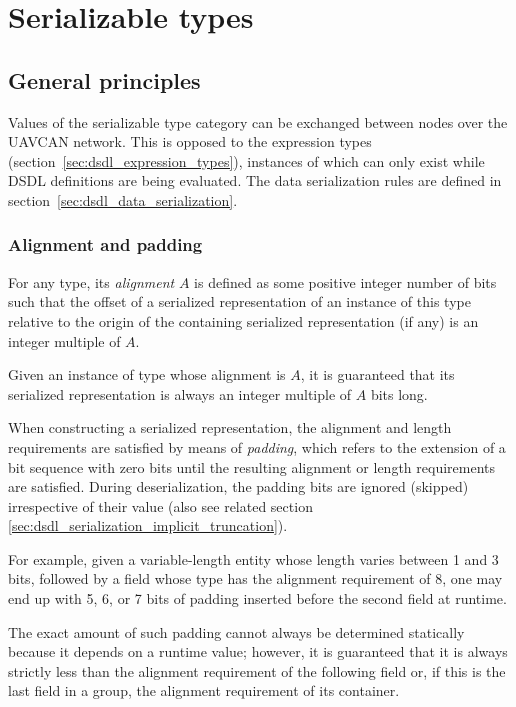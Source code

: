 \section{Serializable types}\label{sec:dsdl_serializable_types}

\subsection{General principles}

Values of the serializable type category can be exchanged between nodes over the UAVCAN network.
This is opposed to the expression types (section~\ref{sec:dsdl_expression_types}),
instances of which can only exist while DSDL definitions are being evaluated.
The data serialization rules are defined in section~\ref{sec:dsdl_data_serialization}.

\subsubsection{Alignment and padding}\label{sec:dsdl_serializable_alignment_padding}

For any type, its \emph{alignment} $A$ is defined as some positive integer number of bits such that the offset of a
serialized representation of an instance of this type relative to the origin of the
containing serialized representation (if any) is an integer multiple of $A$.

Given an instance of type whose alignment is $A$,
it is guaranteed that its serialized representation is always an integer multiple of $A$ bits long.

When constructing a serialized representation,
the alignment and length requirements are satisfied by means of \emph{padding},
which refers to the extension of a bit sequence with zero bits until
the resulting alignment or length requirements are satisfied.
During deserialization, the padding bits are ignored (skipped) irrespective of their value
(also see related section \ref{sec:dsdl_serialization_implicit_truncation}).

\begin{remark}
    For example, given a variable-length entity whose length varies between 1 and 3 bits,
    followed by a field whose type has the alignment requirement of 8,
    one may end up with 5, 6, or 7 bits of padding inserted before the second field at runtime.

    The exact amount of such padding cannot always be determined statically because it depends on a runtime value;
    however, it is guaranteed that it is always strictly less than the alignment requirement of the following field
    or, if this is the last field in a group, the alignment requirement of its container.
\end{remark}

